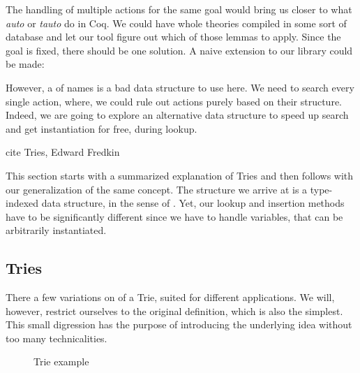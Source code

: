 The handling of multiple actions for the same goal would bring us closer to what
\emph{auto} or \emph{tauto} do in Coq. We could have whole theories compiled in some sort
of database and let our tool figure out which of those lemmas to apply. Since the goal is
fixed, there should be one solution. A naive extension to our library could be made:


However, a  of names is a bad data structure to use here. We need to search
every single action, where, we could rule out actions purely based on their structure.
Indeed, we are going to explore an alternative data structure to speed up search and get
instantiation for free, during lookup.

\begin{TODO}
  \item cite Tries, Edward Fredkin
\end{TODO}

This section starts with a summarized explanation of Tries and then follows with our
generalization of the same concept. The structure we arrive at is a type-indexed data structure,
in the sense of \cite{Hinze04}. Yet, our lookup and insertion methods have to be significantly different
since we have to handle variables, that can be arbitrarily instantiated.

\subsection{Tries}

There a few variations on of a Trie, suited for different applications. We will, however,
restrict ourselves to the original definition, which is also the simplest. This small digression
has the purpose of introducing the underlying idea without too many technicalities.

\begin{wrapfigure}{r}{0.30\textwidth}
\begin{center}
\end{center}
\caption{Trie example}
\label{fig:firsttrie}
\end{wrapfigure}

